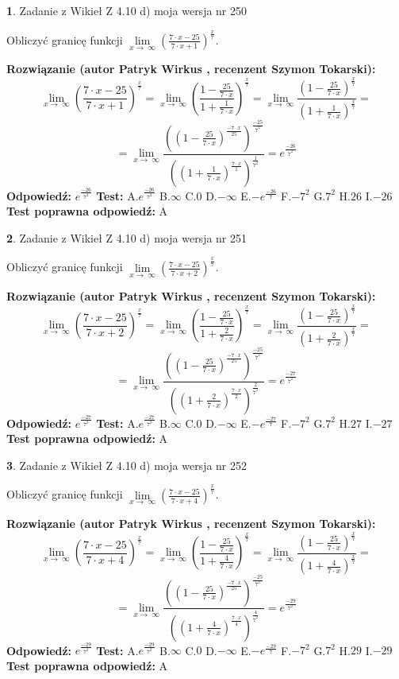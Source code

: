 \documentclass[12pt, a4paper]{article}
\theoremstyle{definition} %
\newtheorem{zad}{}
\newcommand{\zadStart}[1]{\begin{zad}#1\newline}
\newcommand{\zadStop}{\end{zad}}
\newcommand{\rozwStart}[2]{\noindent \textbf{Rozwiązanie (autor #1 , recenzent #2): }\newline}
\newcommand{\rozwStop}{\newline}
\newcommand{\odpStart}{\noindent \textbf{Odpowiedź:}\newline}
\newcommand{\odpStop}{\newline}
\newcommand{\testStart}{\noindent \textbf{Test:}\newline}
\newcommand{\testStop}{\newline}
\newcommand{\kluczStart}{\noindent \textbf{Test poprawna odpowiedź:}\newline}
\newcommand{\kluczStop}{\newline}
\begin{document}
\zadStart{Zadanie z Wikieł Z 4.10 d) moja wersja nr 250}


Obliczyć granicę funkcji  $\lim\limits_{x\to\ \infty}(\frac{7\cdot x-25}{7\cdot x+1})^{\frac{x}{7}}$.
\zadStop
\rozwStart{Patryk Wirkus}{Szymon Tokarski}
$$\lim\limits_{x\to\ \infty}(\frac{7\cdot x-25}{7\cdot x+1})^{\frac{x}{7}} = \lim\limits_{x\to\ \infty}(\frac{1-\frac{25}{7\cdot x}}{1+\frac{1}{7\cdot x}})^{\frac{x}{7}}=\lim\limits_{x\to\ \infty}\frac{(1-\frac{25}{7\cdot x})^{\frac{x}{7}}}{(1+\frac{1}{7\cdot x})^{\frac{x}{7}}}=$$
$$=\lim\limits_{x\to\ \infty}\frac{((1-\frac{25}{7\cdot x})^{\frac{-7\cdot x}{25}})^{\frac{-25}{7^{2}}}}{((1+\frac{1}{7\cdot x})^{\frac{7\cdot x}{1}})^{\frac{1}{7^{2}}}}=e^{\frac{-26}{7^{2}}}$$
\rozwStop
\odpStart
$e^{\frac{-26}{7^{2}}}$
\odpStop
\testStart
A.$e^{\frac{-26}{7^{2}}}$ B.$\infty$ C.$0$ D.$-\infty$ E.$-e^{\frac{-26}{7}}$
F.$-7^{2}$ G.$7^{2}$
H.$26$
I.$-26$
\testStop
\kluczStart
A
\kluczStop



\zadStart{Zadanie z Wikieł Z 4.10 d) moja wersja nr 251}


Obliczyć granicę funkcji  $\lim\limits_{x\to\ \infty}(\frac{7\cdot x-25}{7\cdot x+2})^{\frac{x}{7}}$.
\zadStop
\rozwStart{Patryk Wirkus}{Szymon Tokarski}
$$\lim\limits_{x\to\ \infty}(\frac{7\cdot x-25}{7\cdot x+2})^{\frac{x}{7}} = \lim\limits_{x\to\ \infty}(\frac{1-\frac{25}{7\cdot x}}{1+\frac{2}{7\cdot x}})^{\frac{x}{7}}=\lim\limits_{x\to\ \infty}\frac{(1-\frac{25}{7\cdot x})^{\frac{x}{7}}}{(1+\frac{2}{7\cdot x})^{\frac{x}{7}}}=$$
$$=\lim\limits_{x\to\ \infty}\frac{((1-\frac{25}{7\cdot x})^{\frac{-7\cdot x}{25}})^{\frac{-25}{7^{2}}}}{((1+\frac{2}{7\cdot x})^{\frac{7\cdot x}{2}})^{\frac{2}{7^{2}}}}=e^{\frac{-27}{7^{2}}}$$
\rozwStop
\odpStart
$e^{\frac{-27}{7^{2}}}$
\odpStop
\testStart
A.$e^{\frac{-27}{7^{2}}}$ B.$\infty$ C.$0$ D.$-\infty$ E.$-e^{\frac{-27}{7}}$
F.$-7^{2}$ G.$7^{2}$
H.$27$
I.$-27$
\testStop
\kluczStart
A
\kluczStop



\zadStart{Zadanie z Wikieł Z 4.10 d) moja wersja nr 252}


Obliczyć granicę funkcji  $\lim\limits_{x\to\ \infty}(\frac{7\cdot x-25}{7\cdot x+4})^{\frac{x}{7}}$.
\zadStop
\rozwStart{Patryk Wirkus}{Szymon Tokarski}
$$\lim\limits_{x\to\ \infty}(\frac{7\cdot x-25}{7\cdot x+4})^{\frac{x}{7}} = \lim\limits_{x\to\ \infty}(\frac{1-\frac{25}{7\cdot x}}{1+\frac{4}{7\cdot x}})^{\frac{x}{7}}=\lim\limits_{x\to\ \infty}\frac{(1-\frac{25}{7\cdot x})^{\frac{x}{7}}}{(1+\frac{4}{7\cdot x})^{\frac{x}{7}}}=$$
$$=\lim\limits_{x\to\ \infty}\frac{((1-\frac{25}{7\cdot x})^{\frac{-7\cdot x}{25}})^{\frac{-25}{7^{2}}}}{((1+\frac{4}{7\cdot x})^{\frac{7\cdot x}{4}})^{\frac{4}{7^{2}}}}=e^{\frac{-29}{7^{2}}}$$
\rozwStop
\odpStart
$e^{\frac{-29}{7^{2}}}$
\odpStop
\testStart
A.$e^{\frac{-29}{7^{2}}}$ B.$\infty$ C.$0$ D.$-\infty$ E.$-e^{\frac{-29}{7}}$
F.$-7^{2}$ G.$7^{2}$
H.$29$
I.$-29$
\testStop
\kluczStart
A
\kluczStop
\end{document}
